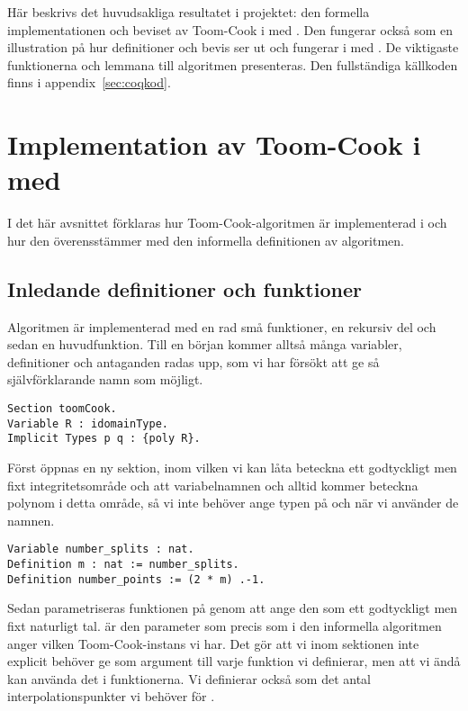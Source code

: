 Här beskrivs det huvudsakliga resultatet i projektet: den formella
implementationen och beviset av Toom-Cook i \coq{} med \ssr{}. Den fungerar
också som en illustration på hur definitioner och bevis ser ut och fungerar i
\coq{} med \ssr{}. De viktigaste funktionerna och lemmana till algoritmen
presenteras. Den fullständiga källkoden finns i appendix~\ref{sec:coqkod}.

\section{Implementation av Toom-Cook i \coq{} med \ssr{}}
\label{sec:formellimplementation}
I det här avsnittet förklaras hur Toom-Cook-algoritmen är implementerad i
\ssr{} och hur den överensstämmer med den informella definitionen av
algoritmen.

\subsection{Inledande definitioner och funktioner}
\label{section:forminl}
Algoritmen är implementerad med en rad små funktioner, en rekursiv del och
sedan en huvudfunktion. Till en början kommer alltså många variabler,
definitioner och antaganden radas upp, som vi har försökt att ge så
självförklarande namn som möjligt.

\begin{lstlisting}
Section toomCook.
Variable R : idomainType.
Implicit Types p q : {poly R}.
\end{lstlisting}

Först öppnas en ny sektion, inom vilken vi kan låta  beteckna ett
godtyckligt men fixt integritetsområde och att variabelnamnen  och 
alltid kommer beteckna polynom i detta område, så vi inte behöver ange typen på
 och  när vi använder de namnen.

\begin{lstlisting}
Variable number_splits : nat.
Definition m : nat := number_splits.
Definition number_points := (2 * m) .-1.
\end{lstlisting}

Sedan parametriseras funktionen på  genom att ange den som ett godtyckligt
men fixt naturligt tal.  är den parameter som precis som i den informella
algoritmen anger vilken Toom-Cook-instans vi har. Det gör att vi inom sektionen
inte explicit behöver ge  som argument till varje funktion vi definierar,
men att vi ändå kan använda det i funktionerna. Vi definierar också
 som det antal interpolationspunkter vi behöver för \toomm{}.

